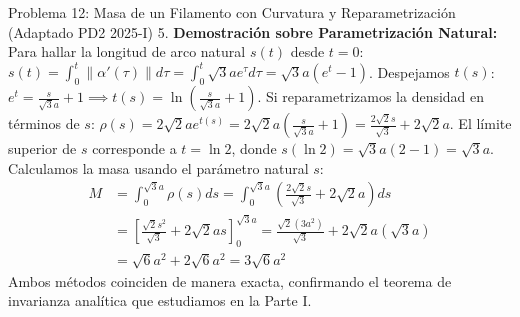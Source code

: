 \documentclass[11pt,a4paper]{article}
\begin{document}
\begin{ejerciciobox}{Problema 12: Masa de un Filamento con Curvatura y Reparametrización (Adaptado PD2 2025-I)}
5. \textbf{Demostración sobre Parametrización Natural:}
Para hallar la longitud de arco natural $s(t)$ desde $t=0$:
$s(t) = \int_0^t \|\alpha'(\tau)\| d\tau = \int_0^t \sqrt{3} a e^\tau d\tau = \sqrt{3} a (e^t - 1)$.
Despejamos $t(s)$:
$e^t = \frac{s}{\sqrt{3}a} + 1 \implies t(s) = \ln\left(\frac{s}{\sqrt{3}a} + 1\right)$.
Si reparametrizamos la densidad en términos de $s$:
$\rho(s) = 2\sqrt{2} a e^{t(s)} = 2\sqrt{2} a \left(\frac{s}{\sqrt{3}a} + 1\right) = \frac{2\sqrt{2}s}{\sqrt{3}} + 2\sqrt{2}a$.
El límite superior de $s$ corresponde a $t=\ln 2$, donde $s(\ln 2) = \sqrt{3} a (2 - 1) = \sqrt{3} a$.
Calculamos la masa usando el parámetro natural $s$:
\begin{align*}
M &= \int_0^{\sqrt{3}a} \rho(s) ds = \int_0^{\sqrt{3}a} \left( \frac{2\sqrt{2}s}{\sqrt{3}} + 2\sqrt{2}a \right) ds \\
&= \left[ \frac{\sqrt{2}s^2}{\sqrt{3}} + 2\sqrt{2}as \right]_0^{\sqrt{3}a} = \frac{\sqrt{2}(3a^2)}{\sqrt{3}} + 2\sqrt{2}a(\sqrt{3}a) \\
&= \sqrt{6}a^2 + 2\sqrt{6}a^2 = 3\sqrt{6}a^2
\end{align*}
Ambos métodos coinciden de manera exacta, confirmando el teorema de invarianza analítica que estudiamos en la Parte I.

\end{ejerciciobox}
\end{document}

